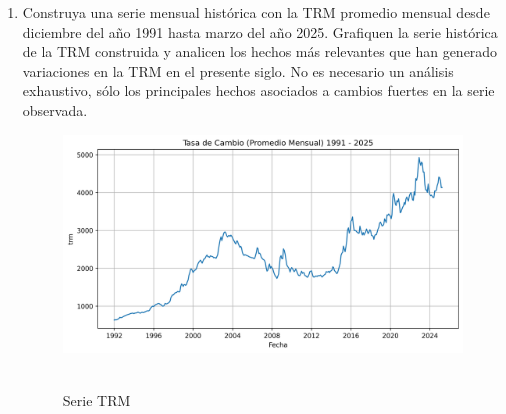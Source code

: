 \documentclass{article}
\theoremstyle{remark}
\theoremstyle{definition}
\begin{document}
\begin{enumerate}[label = \emph{\alph*})]
    \item {Construya una serie mensual hist\'orica con la TRM promedio mensual desde diciembre del año 1991 hasta marzo del año 2025. Grafiquen la serie hist\'orica de la TRM construida y analicen los hechos m\'as relevantes que han generado variaciones en la TRM en el presente siglo. No es necesario un an\'alisis exhaustivo, s\'olo los principales hechos asociados a cambios fuertes en la serie observada.}
        \begin{tcolorbox}[title=Soluci\'on 2.a]
            \begin{figure}[H]
                \centering
                \includegraphics[width=0.9\linewidth]{output/graf_trm.png}\
                \caption{Serie TRM}
                \label{fig:serie_trm}
            \end{figure}


\end{tcolorbox}
\end{enumerate}
\end{document}
